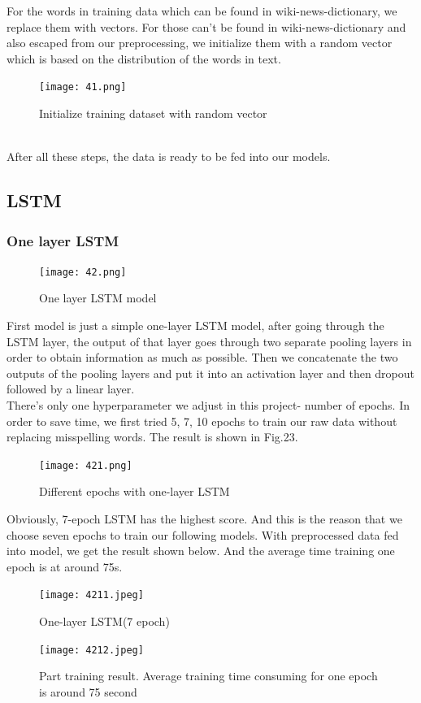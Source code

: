 \documentclass{article}
\begin{document}
\noindent For the words in training data which can  be found in wiki-news-dictionary, we replace them with vectors. For those can’t be found in wiki-news-dictionary and also escaped from our preprocessing, we initialize them with a random vector which is based on the distribution of the words in text.\\
\begin{figure}[h]
	\centering
	\texttt{[image: 41.png]}
	\caption{Initialize training dataset with random vector}
\end{figure}\\
\noindent After all these steps, the data is ready to be fed into our models.\\

\subsection{LSTM}
\subsubsection{One layer LSTM}
\begin{figure}[h]
	\centering
	\texttt{[image: 42.png]}
	\caption{One layer LSTM model}
\end{figure}
\noindent First model is just a simple one-layer LSTM model, after going through the LSTM layer, the output of that layer goes through two separate pooling layers in order to obtain information as much as possible. Then we concatenate the two outputs of the pooling layers and put it into an activation layer and then dropout followed by a linear layer.\\

\noindent There’s only one hyperparameter we adjust in this project- number of epochs. In order to save time, we first tried 5, 7, 10 epochs to train our raw data without replacing misspelling words. The result is shown in Fig.23.\\
\begin{figure}[H]
	\centering
	\texttt{[image: 421.png]}
	\caption{Different epochs with one-layer LSTM}
\end{figure}
\noindent Obviously, 7-epoch LSTM has the highest score. And this is the reason that we choose seven epochs to train our following models.
With preprocessed data fed into model, we get the result shown below. And the average time training one epoch is at around 75s.
\begin{figure}[H]
	\centering
	\texttt{[image: 4211.jpeg]}
	\caption{One-layer LSTM(7 epoch)
	}
\end{figure}
\begin{figure}[H]
	\centering
	\texttt{[image: 4212.jpeg]}
	\caption{Part training result. Average training time consuming for one epoch is around 75 second
	}
\end{figure}
\end{document}
